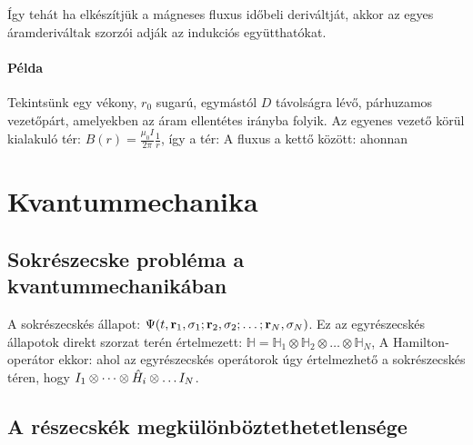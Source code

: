    Így tehát ha elkészítjük a mágneses fluxus időbeli deriváltját, akkor az egyes áramderiváltak szorzói adják az indukciós együtthatókat.
   
   \paragraph{Példa}
    
    Tekintsünk egy vékony, $r_0$ sugarú, egymástól $D$ távolságra lévő, párhuzamos vezetőpárt, amelyekben az áram ellentétes irányba folyik. Az egyenes vezető körül kialakuló tér: $B(r)=\frac{\mu_0 I}{2\pi}\frac{1}{r}$, így a tér:
    A fluxus a kettő között:
    ahonnan
   
 \section{Kvantummechanika}
  
  \subsection{Sokrészecske probléma a kvantummechanikában} 
   
   A sokrészecskés állapot: $\Psi(t,\mathbf{r}_1,\sigma_1;\mathbf{r}_2,\sigma_2;\dots;\mathbf{r}_N,\sigma_N)$. Ez az egyrészecskés állapotok direkt szorzat terén értelmezett: $\mathbb{H}=\mathbb{H}_1\otimes\mathbb{H}_2\otimes\dots\otimes\mathbb{H}_N$,
   A Hamilton-operátor ekkor:
   ahol az egyrészecskés operátorok úgy értelmezhető a sokrészecskés téren, hogy $I_1\otimes\dots\otimes\hat{H}_i\otimes\dots I_N$.
   
  \subsection{A részecskék megkülönböztethetetlensége}
   
